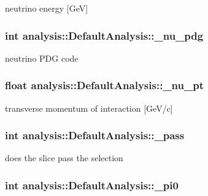 neutrino energy \mbox{[}Ge\-V\mbox{]} \hypertarget{classanalysis_1_1DefaultAnalysis_a625c353bb8912893b77a14f44d4f00b0}{
\subsubsection[{\-\_\-nu\-\_\-pdg}]{\setlength{\rightskip}{0pt plus 5cm}int analysis\-::\-Default\-Analysis\-::\-\_\-nu\-\_\-pdg\hspace{0.3cm}{\ttfamily [private]}}}\label{classanalysis_1_1DefaultAnalysis_a625c353bb8912893b77a14f44d4f00b0}
neutrino P\-D\-G code \hypertarget{classanalysis_1_1DefaultAnalysis_a901956985dfd610c781bedf7bfc9754a}{
\subsubsection[{\-\_\-nu\-\_\-pt}]{\setlength{\rightskip}{0pt plus 5cm}float analysis\-::\-Default\-Analysis\-::\-\_\-nu\-\_\-pt\hspace{0.3cm}{\ttfamily [private]}}}\label{classanalysis_1_1DefaultAnalysis_a901956985dfd610c781bedf7bfc9754a}
transverse momentum of interaction \mbox{[}Ge\-V/c\mbox{]} \hypertarget{classanalysis_1_1DefaultAnalysis_a8d58d05d4b0750a67babff41beece3ac}{
\subsubsection[{\-\_\-pass}]{\setlength{\rightskip}{0pt plus 5cm}int analysis\-::\-Default\-Analysis\-::\-\_\-pass\hspace{0.3cm}{\ttfamily [private]}}}\label{classanalysis_1_1DefaultAnalysis_a8d58d05d4b0750a67babff41beece3ac}
does the slice pass the selection \hypertarget{classanalysis_1_1DefaultAnalysis_a2a00585c8fd4fcc84f42d50f271ff78a}{
\subsubsection[{\-\_\-pi0}]{\setlength{\rightskip}{0pt plus 5cm}int analysis\-::\-Default\-Analysis\-::\-\_\-pi0\hspace{0.3cm}{\ttfamily [private]}}}\label{classanalysis_1_1DefaultAnalysis_a2a00585c8fd4fcc84f42d50f271ff78a}

